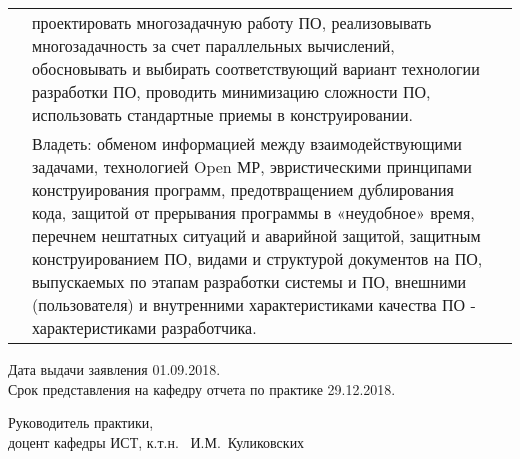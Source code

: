\documentclass[a4paper, 12pt]{extreport}
\begin{document}
\begin{longtable}{|m{4.5cm}|m{6.5cm}|m{4.5cm}|}
                 & проектировать многозадачную работу ПО, реализовывать многозадачность за счет параллельных вычислений,
                 обосновывать и выбирать соответствующий вариант технологии разработки ПО, проводить минимизацию
                 сложности ПО, использовать стандартные приемы в конструировании. & \\
                 & Владеть: обменом информацией между взаимодействующими задачами, технологией Open МР, эвристическими
                 принципами конструирования программ, предотвращением дублирования кода, защитой от прерывания программы
                 в «неудобное» время, перечнем нештатных ситуаций и аварийной защитой, защитным конструированием ПО,
                 видами и структурой документов на ПО, выпускаемых по этапам разработки системы и ПО, внешними
                 (пользователя) и внутренними характеристиками качества ПО - характеристиками разработчика. & \\
                 \hline
    \end{longtable}

    \noindent Дата выдачи заявления 01.09.2018. \\
    Срок представления на кафедру отчета по практике 29.12.2018. \\
    \vspace{24pt}

    \noindent Руководитель практики, \\
    доцент кафедры ИСТ, к.т.н. \hrulefill\mbox{ И.М. Куликовских} \\
    \vspace{12pt}
\end{document}
